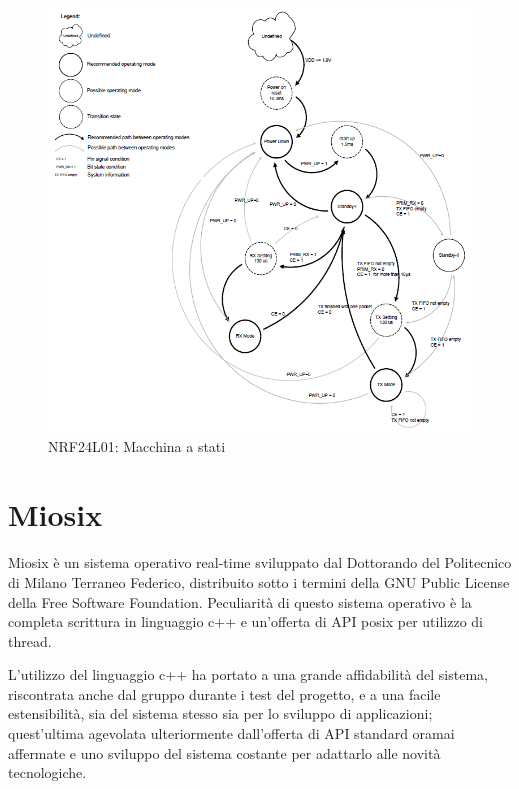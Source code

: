\begin{figure}[H]
	\centering
	\includegraphics[width=1.0\textwidth]{figure/nrf-state-diagram.png}
	\caption{NRF24L01: Macchina a stati\label{figure:macchina_a_stati}}
\end{figure}

\section{Miosix}
Miosix\cite{miosix} è un sistema operativo real-time sviluppato dal Dottorando del Politecnico di Milano Terraneo Federico, distribuito sotto i termini della GNU Public License\cite{gnu-license} della Free Software Foundation\cite{free-software-foundation}. Peculiarità di questo sistema operativo è la completa scrittura in linguaggio c++ e un'offerta di API posix per utilizzo di thread.\par
L'utilizzo del linguaggio c++ ha portato a una grande affidabilità del sistema, riscontrata anche dal gruppo durante i test del progetto, e a una facile estensibilità, sia del sistema stesso sia per lo sviluppo di applicazioni; quest'ultima agevolata ulteriormente dall'offerta di API standard oramai affermate e uno sviluppo del sistema costante per adattarlo alle novità tecnologiche.

